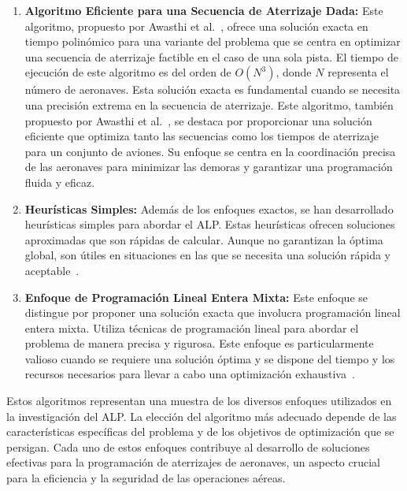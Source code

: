 \documentclass[letter, 10pt]{article}
\begin{document}
\begin{enumerate}
    \item \textbf{Algoritmo Eficiente para una Secuencia de Aterrizaje Dada:} Este algoritmo, propuesto por Awasthi et al.~\cite{awasthi2013aircraft}, ofrece una soluci\'on exacta en tiempo polin\'omico para una variante del problema que se centra en optimizar una secuencia de aterrizaje factible en el caso de una sola pista. El tiempo de ejecuci\'on de este algoritmo es del orden de $O(N^3)$, donde $N$ representa el n\'umero de aeronaves. Esta soluci\'on exacta es fundamental cuando se necesita una precisi\'on extrema en la secuencia de aterrizaje. Este algoritmo, tambi\'en propuesto por Awasthi et al.~\cite{awasthi2013aircraft}, se destaca por proporcionar una soluci\'on eficiente que optimiza tanto las secuencias como los tiempos de aterrizaje para un conjunto de aviones. Su enfoque se centra en la coordinaci\'on precisa de las aeronaves para minimizar las demoras y garantizar una programaci\'on fluida y eficaz.
    
    \item \textbf{Heur\'isticas Simples:} Adem\'as de los enfoques exactos, se han desarrollado heur\'isticas simples para abordar el ALP. Estas heur\'isticas ofrecen soluciones aproximadas que son r\'apidas de calcular. Aunque no garantizan la \'optima global, son \'utiles en situaciones en las que se necesita una soluci\'on r\'apida y aceptable~\cite{salehipour2018algorithm}.
    
    \item \textbf{Enfoque de Programaci\'on Lineal Entera Mixta:} Este enfoque se distingue por proponer una soluci\'on exacta que involucra programaci\'on lineal entera mixta. Utiliza t\'ecnicas de programaci\'on lineal para abordar el problema de manera precisa y rigurosa. Este enfoque es particularmente valioso cuando se requiere una soluci\'on \'optima y se dispone del tiempo y los recursos necesarios para llevar a cabo una optimizaci\'on exhaustiva~\cite{IKLI2021105336}.
\end{enumerate}

Estos algoritmos representan una muestra de los diversos enfoques utilizados en la investigaci\'on del ALP. La elecci\'on del algoritmo m\'as adecuado depende de las caracter\'isticas espec\'ificas del problema y de los objetivos de optimizaci\'on que se persigan. Cada uno de estos enfoques contribuye al desarrollo de soluciones efectivas para la programaci\'on de aterrizajes de aeronaves, un aspecto crucial para la eficiencia y la seguridad de las operaciones a\'ereas.
\end{document}
